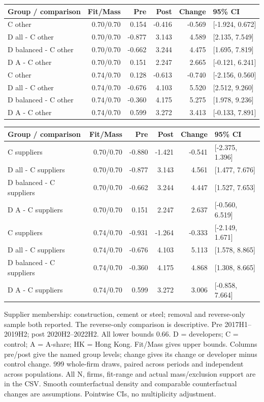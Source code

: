 \begingroup\small
\setlength{\tabcolsep}{3.5pt}
\begin{tabular}{lrrrrl}
\toprule
Group / comparison & Fit/Mass & Pre & Post & Change & 95\% CI \\
\midrule
C other & 0.70/0.70 & 0.154 & -0.416 & -0.569 & [-1.924, 0.672] \\
D all - C other & 0.70/0.70 & -0.877 & 3.143 & 4.589 & [2.135, 7.549] \\
D balanced - C other & 0.70/0.70 & -0.662 & 3.244 & 4.475 & [1.695, 7.819] \\
D A - C other & 0.70/0.70 & 0.151 & 2.247 & 2.665 & [-0.121, 6.241] \\
C other & 0.74/0.70 & 0.128 & -0.613 & -0.740 & [-2.156, 0.560] \\
D all - C other & 0.74/0.70 & -0.676 & 4.103 & 5.520 & [2.512, 9.260] \\
D balanced - C other & 0.74/0.70 & -0.360 & 4.175 & 5.275 & [1.978, 9.236] \\
D A - C other & 0.74/0.70 & 0.599 & 3.272 & 3.413 & [-0.133, 7.891] \\
\bottomrule
\end{tabular}
\par\medskip
\begin{tabular}{lrrrrl}
\toprule
Group / comparison & Fit/Mass & Pre & Post & Change & 95\% CI \\
\midrule
C suppliers & 0.70/0.70 & -0.880 & -1.421 & -0.541 & [-2.375, 1.396] \\
D all - C suppliers & 0.70/0.70 & -0.877 & 3.143 & 4.561 & [1.477, 7.676] \\
D balanced - C suppliers & 0.70/0.70 & -0.662 & 3.244 & 4.447 & [1.527, 7.653] \\
D A - C suppliers & 0.70/0.70 & 0.151 & 2.247 & 2.637 & [-0.560, 6.519] \\
C suppliers & 0.74/0.70 & -0.931 & -1.264 & -0.333 & [-2.149, 1.671] \\
D all - C suppliers & 0.74/0.70 & -0.676 & 4.103 & 5.113 & [1.578, 8.865] \\
D balanced - C suppliers & 0.74/0.70 & -0.360 & 4.175 & 4.868 & [1.308, 8.665] \\
D A - C suppliers & 0.74/0.70 & 0.599 & 3.272 & 3.006 & [-0.858, 7.664] \\
\bottomrule
\end{tabular}
\par\medskip
\footnotesize Supplier membership: construction, cement or steel; removal and reverse-only sample both reported. The reverse-only comparison is descriptive. Pre 2017H1--2019H2; post 2020H2--2022H2. All lower bounds 0.66.  D = developers; C = control; A = A-share; HK = Hong Kong. Fit/Mass gives upper bounds. Columns pre/post give the named group levels; change gives its change or developer minus control change.  999 whole-firm draws, paired across periods and independent across populations. All N, firms, fit-range and actual mass/exclusion support are in the CSV.  Smooth counterfactual density and comparable counterfactual changes are assumptions. Pointwise CIs, no multiplicity adjustment.
\endgroup
